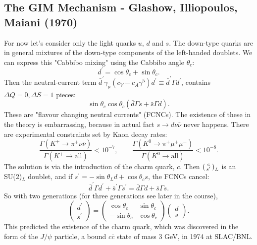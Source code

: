 \subsection{The GIM Mechanism - Glashow, Illiopoulos, Maiani (1970)}
%
For now let's consider only the light quarks $u$, $d$ and $s$. The down-type quarks are in general mixtures of the down-type components of the left-handed doublets. We can express this "Cabbibo mixing" using the Cabbibo angle $\theta_c$:
\begin{equation}
d^\prime = \cos\theta_c + \sin\theta_c.
\end{equation}
Then the neutral-current term $\bar{d}^\prime \gamma_\mu (c_V - c_A \gamma^5) d^\prime \equiv \bar{d}^\prime \Gamma d^\prime$, contains $\Delta Q = 0, \Delta S = 1$ pieces:
\begin{equation}
\sin\theta_c \cos\theta_c (\bar{d} \Gamma s + \bar{s} \Gamma d) .
\end{equation}
These are "flavour changing neutral currents" (FCNCs). The existence of these in the theory is embarrassing, because in actual fact $s \to d \nu \bar{\nu}$ never happens. There are experimental constraints set by Kaon decay rates:
\begin{equation}
\frac{\Gamma(K^+ \to \pi^+ \nu \bar{\nu})}{\Gamma(K^+ \to \text{all})} < 10^{-7}, \qquad \frac{\Gamma(K^0 \to \pi^+ \mu^+ \mu^-)}{\Gamma(K^0 \to \text{all})} < 10^{-8}.
\end{equation}
The solution is via the introduction of the charm quark, $c$. Then $\left(\begin{smallmatrix}c\\s^\prime\end{smallmatrix}\right)_L$ is an SU(2)$_L$ doublet, and if $s^\prime = -\sin\theta_L d + \cos \theta_c s$, the FCNCs cancel:
\begin{equation}
\bar{d}^\prime \Gamma d^\prime + \bar{s}^\prime \Gamma s^\prime =\bar{d} \Gamma d + \bar{s} \Gamma s.
\end{equation}
So with two generations (for three generations see later in the course), 
\[\left( \begin{array}{cc}
d^\prime \\
s^\prime 
\end{array} \right) =
 \left( \begin{array}{cc}
\cos\theta_c & \sin\theta_c \\
-\sin\theta_c & \cos\theta_c  \end{array} \right) 
\left( \begin{array}{cc}
d \\
s
\end{array} \right). \]
This predicted the existence of the charm quark, which was discovered in the form of the $J/\psi$ particle, a bound $c\bar{c}$ state of mass 3 GeV, in 1974 at SLAC/BNL.
%
